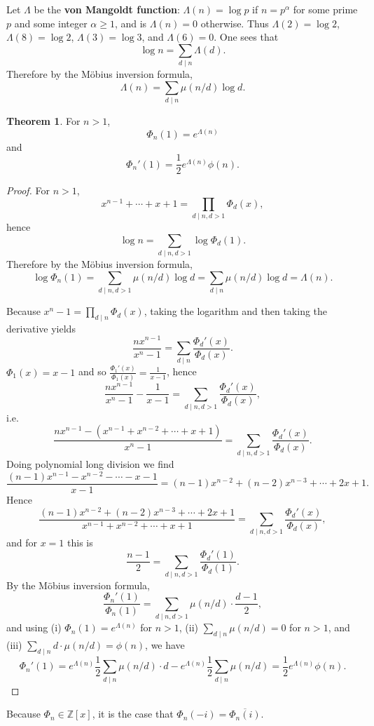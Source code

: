 \documentclass{article}
\theoremstyle{definition}
\newtheorem{theorem}{Theorem}
\theoremstyle{definition}
\begin{document}
Let $\Lambda$ be the \textbf{von Mangoldt function}: $\Lambda(n)=\log p$ if $n=p^\alpha$ for some prime $p$ and some integer
$\alpha \geq 1$, and is $\Lambda(n)=0$ otherwise. Thus $\Lambda(2)=\log 2$, $\Lambda(8)=\log 2$, $\Lambda(3)=\log 3$,
and $\Lambda(6) = 0$. One sees that
\[
\log n = \sum_{d \mid n} \Lambda(d).
\]
Therefore by the M\"obius inversion formula,
\[
\Lambda(n) = \sum_{d \mid n} \mu(n/d) \log d.
\]

\begin{theorem}
For $n>1$,
\[
\Phi_n(1) =  e^{\Lambda(n)}
\]
and
\[
\Phi_n'(1) =\frac{1}{2} e^{\Lambda(n)}  \phi(n).
\]
\label{specialvalues}
\end{theorem}
\begin{proof}
For $n>1$,
\[
x^{n-1}+\cdots+x+1 = \prod_{d \mid n, d>1} \Phi_d(x),
\]
hence
\[
\log n = \sum_{d \mid n, d>1} \log \Phi_d(1).
\]
Therefore by the M\"obius inversion formula,
\[
\log \Phi_n(1) = \sum_{d \mid n, d>1} \mu(n/d)  \log d = \sum_{d \mid n} \mu(n/d) \log d = \Lambda(n).
\]


Because $x^n-1 = \prod_{d \mid n} \Phi_d(x)$, taking the logarithm and then taking the derivative
yields
\[
\frac{nx^{n-1}}{x^n-1} = \sum_{d \mid n} \frac{\Phi_d'(x)}{\Phi_d(x)}.
\]
$\Phi_1(x) = x-1$ and so $\frac{\Phi_1'(x)}{\Phi_1(x)} = \frac{1}{x-1}$, hence
\[
\frac{nx^{n-1}}{x^n-1}  - \frac{1}{x-1} = \sum_{d \mid n, d>1} \frac{\Phi_d'(x)}{\Phi_d(x)},
\]
i.e.
\[
\frac{nx^{n-1} - (x^{n-1}+x^{n-2}+\cdots+x+1)}{x^n-1} = \sum_{d \mid n, d>1} \frac{\Phi_d'(x)}{\Phi_d(x)}.
\]
Doing polynomial long division we find
\[
\frac{(n-1)x^{n-1} - x^{n-2} - \cdots - x - 1}{x-1} = (n-1)x^{n-2} + (n-2)x^{n-3} + \cdots + 2x+1.
\]
Hence
\[
\frac{(n-1)x^{n-2} + (n-2)x^{n-3} + \cdots + 2x+1}{x^{n-1}+x^{n-2}+\cdots+x+1} =  \sum_{d \mid n, d>1} \frac{\Phi_d'(x)}{\Phi_d(x)},
\]
and for $x=1$ this is
\[
\frac{n-1}{2} = \sum_{d \mid n, d>1} \frac{\Phi_d'(1)}{\Phi_d(1)}.
\]
By the M\"obius inversion formula,
\[
\frac{\Phi_n'(1)}{\Phi_n(1)} = \sum_{d \mid n, d>1} \mu(n/d) \cdot  \frac{d-1}{2},
\]
and using (i) $\Phi_n(1) = e^{\Lambda(n)}$ for $n>1$, (ii) $\sum_{d \mid n} \mu(n/d) = 0$ for $n>1$,
and (iii) $\sum_{d \mid n} d \cdot \mu(n/d) = \phi(n)$, we have
\[
\Phi_n'(1) =  e^{\Lambda(n)} \frac{1}{2} \sum_{d \mid n} \mu(n/d) \cdot d -e^{\Lambda(n)} \frac{1}{2} \sum_{d \mid n} \mu(n/d)
=\frac{1}{2} e^{\Lambda(n)} \phi(n).
\]
\end{proof}





Because $\Phi_n \in \mathbb{Z}[x]$, it is the case that $\Phi_n(-i) = \overline{\Phi_n(i)}$.
\end{document}

